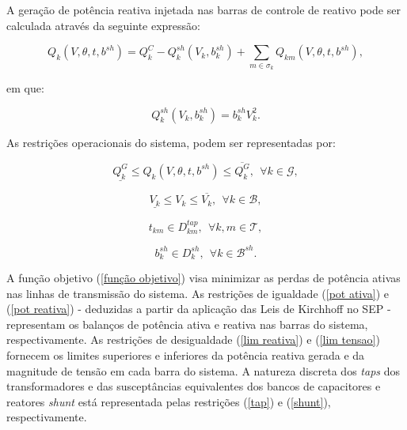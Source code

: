\documentclass[
	12pt,				%
	openany,			%
	twoside,			%
	a4paper,			%
	chapter=TITLE,		%
	section=Title,		%
	subsection=Title,	%
	subsubsection=Title,%
	english,			%
	french,				%
	spanish,			%
	brazil			%
	]{abntex2}
\begin{document}
\begin{ERRATA}
A geração de potência reativa injetada nas barras de controle de reativo pode ser calculada através da seguinte expressão:


\begin{equation} 
Q_{k}(V,\theta,t, b^{sh}) = Q^{C}_k - Q_{k}^{sh}(V_{k},b^{sh}_{k}) +  \sum_{m \in \mathcal{\sigma}_k}Q_{km}(V,\theta,t, b^{sh}),
\end{equation}

\noindent em que:

\begin{equation} 
Q_{k}^{sh}(V_{k},b^{sh}_{k}) = b^{sh}_{k}V_{k}^{2}.
\end{equation}

As restrições operacionais do sistema, podem ser representadas por: 

\begin{equation} \label{lim reativa}
\underline{Q^{G}_{k}} \leq Q_{k}(V,\theta,t,b^{sh}) \leq \overline{Q^{G}_{k}},\ \  \forall k \in \mathcal{G},
\end{equation}

\begin{equation} \label{lim tensao}
\underline{V_{k}} \leq V_{k} \leq \overline{V_{k}},\ \  \forall k \in \mathcal{B},
\end{equation}

\begin{equation} \label{tap}
t_{km} \in D_{km}^{tap},\ \  \forall k,m \in \mathcal{T},
\end{equation}

\begin{equation} \label{shunt}
b^{sh}_{k} \in D_{k}^{sh},\ \  \forall k \in \mathcal{B}^{sh}.
\end{equation}


A função objetivo (\ref{função objetivo}) visa minimizar as perdas de potência ativas nas linhas de transmissão do sistema. As restrições de igualdade (\ref{pot ativa}) e (\ref{pot reativa}) - deduzidas a partir da aplicação das Leis de Kirchhoff no SEP - representam os balanços de potência ativa e reativa nas barras do sistema, respectivamente.  As restrições de desigualdade  (\ref{lim reativa}) e (\ref{lim tensao}) fornecem os limites superiores e inferiores da potência reativa gerada e da magnitude de tensão em cada barra do sistema. A natureza discreta dos \emph{taps} dos transformadores e das susceptâncias equivalentes dos bancos de capacitores e reatores \emph{shunt} está representada pelas restrições (\ref{tap}) e (\ref{shunt}), respectivamente.


\end{ERRATA}
\end{document}
